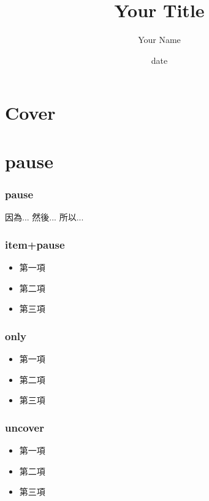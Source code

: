 \documentclass[xcolor=svgnames]{beamer}
\begin{document}
\title[Your Title\hspace{14em}\insertframenumber/\inserttotalframenumber]{Your Title} 
\author{Your Name}
\date{date}

\section{Cover}
\begin{frame}
\titlepage
\end{frame}

\section{pause}
\begin{frame}
\frametitle{pause} %
因為...
\pause
然後...
\pause
所以...
\end{frame}

\begin{frame}
\frametitle{item+pause} %
\begin{itemize}
\item 第一項
\pause
\item 第二項
\pause
\item 第三項
\end{itemize}
\end{frame}

\begin{frame}
\frametitle{only} %
\begin{itemize}
\item<1-> 第一項
\item<2-> 第二項
\item<3-> 第三項
\end{itemize}
\end{frame}

\begin{frame}
\frametitle{uncover} %
\begin{itemize}
\item<1-> 第一項
\item<2-> 第二項
\item<3-> 第三項
\end{itemize}
\end{frame}
\end{document}
